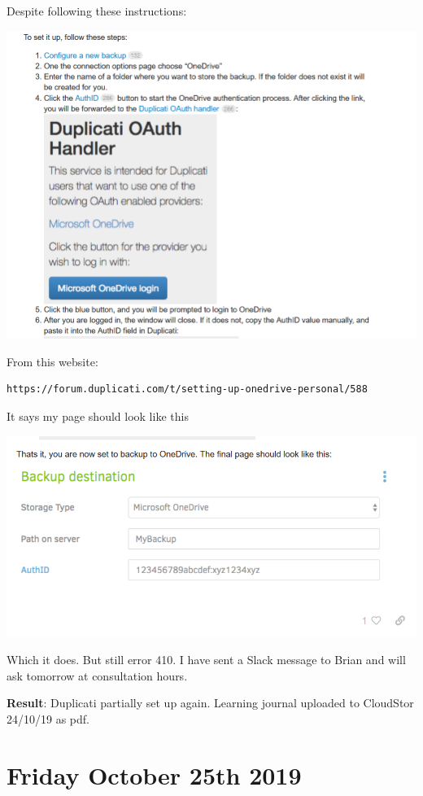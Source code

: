 \documentclass{article}
\begin{document}
Despite following these instructions:

\includegraphics[width=1.0\textwidth]{duplicati_33.PNG}

From this website: 
\begin{verbatim}https://forum.duplicati.com/t/setting-up-onedrive-personal/588\end{verbatim}

It says my page should look like this

\includegraphics[width=1.0\textwidth]{duplicati_34.PNG}

Which it does. But still error 410. I have sent a Slack message to Brian and will ask tomorrow at consultation hours.

\textbf{Result}: Duplicati partially set up again. Learning journal uploaded to CloudStor 24/10/19 as pdf.

\section{Friday October 25th 2019}
\end{document}
